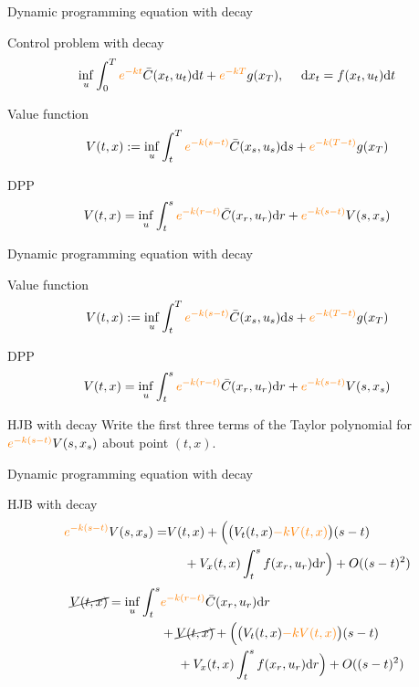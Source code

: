 \documentclass[color=usenames,dvipsnames]{beamer}
\newcommand{\dt}{\text{\normalfont d}t}
\newcommand{\ds}{\text{\normalfont d}s}
\newcommand{\dr}{\text{\normalfont d}r}
\newcommand{\dx}{\text{\normalfont d}x}
\begin{document}

\begin{frame}{Dynamic programming equation with decay}
    \begin{block}
        {Control problem with decay}
        \[
        \inf_{u}\int_0^T {\color{orange}e^{-kt}}\bar{C}(x_t,u_t)\dt+{\color{orange}e^{-kT}}g(x_T),~~~~\dx_t = f(x_t,u_t)\dt
        \]
    \end{block}
    \begin{block}
        {Value function}
        \[
        V(t,x):=\inf_{u}\int_t^T {\color{orange}e^{-k(s-t)}}\bar{C}(x_s,u_s)\ds + {\color{orange}e^{-k(T-t)}}g(x_T)
        \]
    \end{block}
    \begin{block}
        {DPP}
        \[
        V(t,x)=\inf_{u}\int_t^s {\color{orange}e^{-k(r-t)}}\bar{C}(x_r,u_r)\dr + {\color{orange}e^{-k(s-t)}}V(s,x_s)
        \]
    \end{block}
\end{frame}

\begin{frame}{Dynamic programming equation with decay}
    \begin{block}
        {Value function}
        \[
        V(t,x):=\inf_{u}\int_t^T {\color{orange}e^{-k(s-t)}}\bar{C}(x_s,u_s)\ds + {\color{orange}e^{-k(T-t)}}g(x_T)
        \]
    \end{block}
    \begin{block}
        {DPP}
        \[
        V(t,x)=\inf_{u}\int_t^s {\color{orange}e^{-k(r-t)}}\bar{C}(x_r,u_r)\dr + {\color{orange}e^{-k(s-t)}}V(s,x_s)
        \]
    \end{block}
        \begin{block}
        {HJB with decay}
        Write the first three terms of the Taylor polynomial for ${\color{orange}e^{-k(s-t)}}V(s,x_s)$ about point $(t,x)$.
    \end{block}
\end{frame}

\begin{frame}{Dynamic programming equation with decay}
        \begin{block}
        {HJB with decay}
        \[
        \begin{split}
             {\color{orange}e^{-k(s-t)}}V(s,x_s) = &V(t,x) + \Big(\big(V_t(t,x) {\color{orange}- k V(t,x)}\big)(s-t)\\
             &~~~~+ V_x(t,x)\int_t^s f(x_r,u_r)\dr\Big) + O((s-t)^2)
        \end{split}
        \]
        \[
        \begin{split}
            \cancel{V(t,x)}=\inf_{u}\int_t^s &{\color{orange}e^{-k(r-t)}}\bar{C}(x_r,u_r)\dr \\
            &+ \cancel{V(t,x)} + \Big(\big(V_t(t,x) {\color{orange}- k V(t,x)}\big)(s-t)\\
             &~~~~+ V_x(t,x)\int_t^s f(x_r,u_r)\dr\Big) + O((s-t)^2)
        \end{split}
        \]
    \end{block}
\end{frame}
\end{document}
